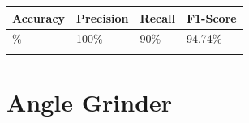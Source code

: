 
{\def\LTcaptype{none} %
\begin{longtable}[]{@{}llll@{}}
\toprule\noalign{}
\textbf{Accuracy} & \textbf{Precision} & \textbf{Recall} &
\textbf{F1-Score} \\
\midrule\noalign{}
\endhead
95\% & 100\% & 90\% & 94.74\% \\
\bottomrule\noalign{}
\end{longtable}
}

\section{Angle Grinder}\label{appendix-e.7.-arc-fault-test-result-for-angle-grinder}


